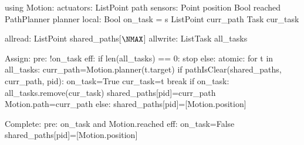using Motion:
  actuators:
    List\<Point\> path
  sensors:
    Point position
    Bool reached
    PathPlanner planner
local:
  Bool on_task = s
  List\<Point\> curr_path
  Task cur_task

allread:
  List\<Point\> shared_paths[$\NMAX$]
allwrite:
  List\<Task\> all_tasks

Assign:
  pre: !on_task
  eff:
     if len(all_tasks) == 0:
        stop
     else: atomic:
        for t in all_tasks:
           curr_path=Motion.planner(t.target)
           if pathIsClear(shared_paths, curr_path, pid):
              on_task=True
              cur_task=t
              break
        if on_task:
           all_tasks.remove(cur_task)
           shared_paths[pid]=curr_path
           Motion.path=curr_path
        else:
           shared_paths[pid]=[Motion.position]

Complete:
    pre: on_task and Motion.reached
    eff: on_task=False
         shared_paths[pid]=[Motion.position]
